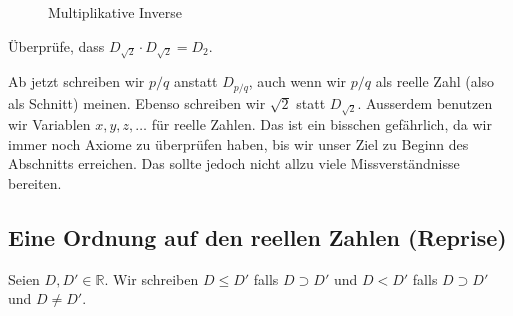 \documentclass[../main.tex]{subfiles}
\begin{document}
\begin{figure}[htb]
  \centering
  \begin{minipage}{0.4\linewidth}
    \centering
    
  \end{minipage}%
  \begin{minipage}{0.4\linewidth}
    \centering
    
  \end{minipage}
  \begin{minipage}{0.4\linewidth}
    \centering
    
  \end{minipage}%
  \begin{minipage}{0.4\linewidth}
    \centering
    
  \end{minipage}%
  \caption{Multiplikative Inverse}%
  \label{fig:multiplikativ-dedekind}
\end{figure}

\begin{exercise}
  Überprüfe, dass $D_{\sqrt 2} \cdot D_{\sqrt 2} = D_{2}$.
\end{exercise}

\begin{remark}
  Ab jetzt schreiben wir $p/q$ anstatt $D_{p/q}$,
  auch wenn wir $p/q$ als reelle Zahl (also als Schnitt)
  meinen.
  Ebenso schreiben wir $\sqrt 2$ statt $D_{\sqrt 2}$.
  Ausserdem benutzen wir Variablen $x,y,z, \dots$
  für reelle Zahlen.
  Das ist ein bisschen gefährlich, da wir immer noch
  Axiome zu überprüfen haben, bis wir unser Ziel zu Beginn
  des Abschnitts erreichen. Das sollte jedoch nicht allzu
  viele Missverständnisse bereiten.
\end{remark}

\subsection*{Eine Ordnung auf den reellen Zahlen (Reprise)}
\begin{definition}
  Seien $D, D' \in \mathbb R$. Wir schreiben $D \leq D'$ falls
  $D \supset D'$ und $D < D'$ falls $D \supset D'$ und $D \neq D'$.
\end{definition}
\end{document}

